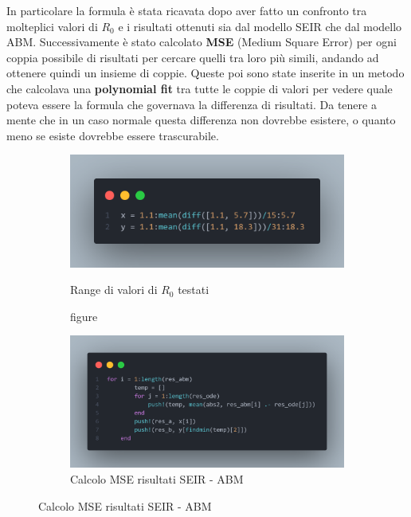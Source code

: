 In particolare la formula è stata ricavata dopo aver fatto un confronto tra molteplici 
valori di $R_0$ e i risultati ottenuti sia dal modello SEIR che dal modello ABM. 
Successivamente è stato calcolato \textbf{MSE} (Medium Square Error) per ogni coppia possibile
di risultati per cercare quelli tra loro più simili, andando ad ottenere quindi un insieme
di coppie. Queste poi sono state inserite in un metodo che calcolava una \textbf{polynomial fit} 
tra tutte le coppie di valori per vedere quale poteva essere la formula che governava la differenza 
di risultati. Da tenere a mente che in un caso normale questa differenza non dovrebbe esistere, 
o quanto meno se esiste dovrebbe essere trascurabile.

\begin{figure}[!hb]
	\centering
	\begin{subfigure}[b]{0.45\textwidth}
		\centering
		\includegraphics[width=\textwidth]{img/r0_range_test.png}
    	\caption{figure}{Range di valori di $R_0$ testati}
    	\label{fig:r0_range_test}
	\end{subfigure}
	\hfill
	\begin{subfigure}[b]{0.45\textwidth}
		\centering
		\includegraphics[width=\textwidth]{img/mse_r0.png}
		\caption{Calcolo MSE risultati SEIR - ABM}
		\label{fig:mse_r0}
	\end{subfigure}
\end{figure}

